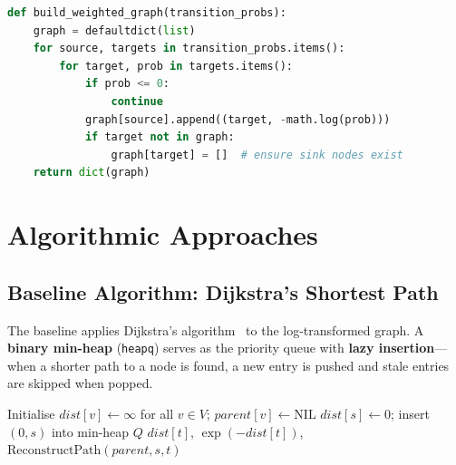 \begin{lstlisting}[language=Python, caption={Graph construction (\texttt{src/graph\_builder.py})}, label=lst:graph_build]
def build_weighted_graph(transition_probs):
    graph = defaultdict(list)
    for source, targets in transition_probs.items():
        for target, prob in targets.items():
            if prob <= 0:
                continue
            graph[source].append((target, -math.log(prob)))
            if target not in graph:
                graph[target] = []  # ensure sink nodes exist
    return dict(graph)
\end{lstlisting}

\section{Algorithmic Approaches}

\subsection{Baseline Algorithm: Dijkstra's Shortest Path}

The baseline applies Dijkstra's algorithm~\citep{dijkstra1959} to the log-transformed graph. A \textbf{binary min-heap} (\texttt{heapq}) serves as the priority queue with \textbf{lazy insertion}---when a shorter path to a node is found, a new entry is pushed and stale entries are skipped when popped.

\begin{algorithm}[H]
\caption{Dijkstra on Transformed Probabilities~\citep{dijkstra1959,cormen2009}}\label{alg:baseline}
\SetAlgoLined
{}
Initialise $\mathit{dist}[v] \leftarrow \infty$ for all $v \in V$; $\mathit{parent}[v] \leftarrow \mathrm{NIL}$\;
$\mathit{dist}[s] \leftarrow 0$; insert $(0, s)$ into min-heap $Q$\;
\Return $\mathit{dist}[t]$, $\exp(-\mathit{dist}[t])$, $\mathrm{ReconstructPath}(\mathit{parent}, s, t)$\;
\end{algorithm}

